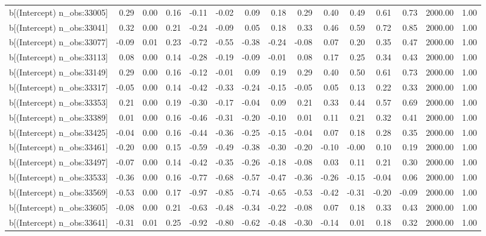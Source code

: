 \begin{table}[ht]
\begin{tabular}{rrrrrrrrrrrrrrr}
  b[(Intercept) n\_obs:33005] & 0.29 & 0.00 & 0.16 & -0.11 & -0.02 & 0.09 & 0.18 & 0.29 & 0.40 & 0.49 & 0.61 & 0.73 & 2000.00 & 1.00 \\ 
  b[(Intercept) n\_obs:33041] & 0.32 & 0.00 & 0.21 & -0.24 & -0.09 & 0.05 & 0.18 & 0.33 & 0.46 & 0.59 & 0.72 & 0.85 & 2000.00 & 1.00 \\ 
  b[(Intercept) n\_obs:33077] & -0.09 & 0.01 & 0.23 & -0.72 & -0.55 & -0.38 & -0.24 & -0.08 & 0.07 & 0.20 & 0.35 & 0.47 & 2000.00 & 1.00 \\ 
  b[(Intercept) n\_obs:33113] & 0.08 & 0.00 & 0.14 & -0.28 & -0.19 & -0.09 & -0.01 & 0.08 & 0.17 & 0.25 & 0.34 & 0.43 & 2000.00 & 1.00 \\ 
  b[(Intercept) n\_obs:33149] & 0.29 & 0.00 & 0.16 & -0.12 & -0.01 & 0.09 & 0.19 & 0.29 & 0.40 & 0.50 & 0.61 & 0.73 & 2000.00 & 1.00 \\ 
  b[(Intercept) n\_obs:33317] & -0.05 & 0.00 & 0.14 & -0.42 & -0.33 & -0.24 & -0.15 & -0.05 & 0.05 & 0.13 & 0.22 & 0.33 & 2000.00 & 1.00 \\ 
  b[(Intercept) n\_obs:33353] & 0.21 & 0.00 & 0.19 & -0.30 & -0.17 & -0.04 & 0.09 & 0.21 & 0.33 & 0.44 & 0.57 & 0.69 & 2000.00 & 1.00 \\ 
  b[(Intercept) n\_obs:33389] & 0.01 & 0.00 & 0.16 & -0.46 & -0.31 & -0.20 & -0.10 & 0.01 & 0.11 & 0.21 & 0.32 & 0.41 & 2000.00 & 1.00 \\ 
  b[(Intercept) n\_obs:33425] & -0.04 & 0.00 & 0.16 & -0.44 & -0.36 & -0.25 & -0.15 & -0.04 & 0.07 & 0.18 & 0.28 & 0.35 & 2000.00 & 1.00 \\ 
  b[(Intercept) n\_obs:33461] & -0.20 & 0.00 & 0.15 & -0.59 & -0.49 & -0.38 & -0.30 & -0.20 & -0.10 & -0.00 & 0.10 & 0.19 & 2000.00 & 1.00 \\ 
  b[(Intercept) n\_obs:33497] & -0.07 & 0.00 & 0.14 & -0.42 & -0.35 & -0.26 & -0.18 & -0.08 & 0.03 & 0.11 & 0.21 & 0.30 & 2000.00 & 1.00 \\ 
  b[(Intercept) n\_obs:33533] & -0.36 & 0.00 & 0.16 & -0.77 & -0.68 & -0.57 & -0.47 & -0.36 & -0.26 & -0.15 & -0.04 & 0.06 & 2000.00 & 1.00 \\ 
  b[(Intercept) n\_obs:33569] & -0.53 & 0.00 & 0.17 & -0.97 & -0.85 & -0.74 & -0.65 & -0.53 & -0.42 & -0.31 & -0.20 & -0.09 & 2000.00 & 1.00 \\ 
  b[(Intercept) n\_obs:33605] & -0.08 & 0.00 & 0.21 & -0.63 & -0.48 & -0.34 & -0.22 & -0.08 & 0.07 & 0.18 & 0.33 & 0.43 & 2000.00 & 1.00 \\ 
  b[(Intercept) n\_obs:33641] & -0.31 & 0.01 & 0.25 & -0.92 & -0.80 & -0.62 & -0.48 & -0.30 & -0.14 & 0.01 & 0.18 & 0.32 & 2000.00 & 1.00 \\ 

\end{tabular}
\end{table}
